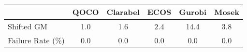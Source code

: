 \begin{tabular}{lccccc}
  \hline
   & \textbf{QOCO} & \textbf{Clarabel} & \textbf{ECOS} & \textbf{Gurobi} & \textbf{Mosek} \\ \hline
  Shifted GM & 1.0 & 1.6 & 2.4 & 14.4 & 3.8 \\ 
  Failure Rate (\%) & 0.0 & 0.0 & 0.0 & 0.0 & 0.0 \\ \hline 
\end{tabular}
